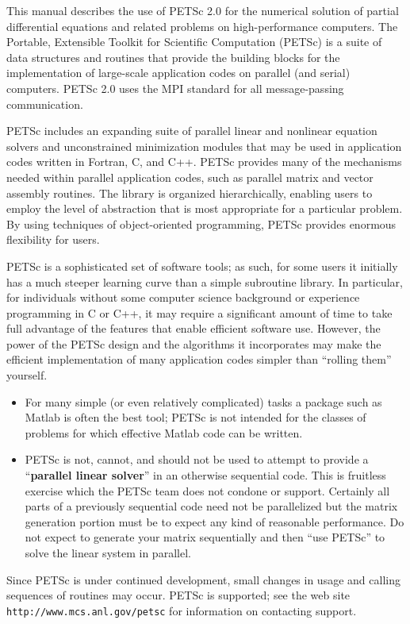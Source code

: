 
%
%

\medskip \medskip
This manual describes the use of PETSc 2.0 for the numerical solution
of partial differential equations and related problems 
on high-performance computers.  The
Portable, Extensible Toolkit for Scientific Computation (PETSc) is a
suite of data structures and routines that provide the building
blocks for the implementation of large-scale application codes on parallel
(and serial) computers.  PETSc 2.0 uses the MPI standard for all
message-passing communication.

PETSc includes an expanding suite of parallel linear and nonlinear
equation solvers and unconstrained minimization modules that may be
used in application codes written in Fortran, C, and C++.  PETSc
provides many of the mechanisms needed within parallel application
codes, such as parallel matrix and vector assembly routines. The library is
organized hierarchically, enabling users to employ the level of
abstraction that is most appropriate for a particular problem. By
using techniques of object-oriented programming, PETSc provides
enormous flexibility for users.

PETSc is a sophisticated set of software tools; as such, for some
users it initially has a much steeper learning curve than a simple
subroutine library. In particular, for individuals without some
computer science background or experience programming in C or C++, it
may require a significant amount of time to take full advantage of the
features that enable efficient software use.  However, the power of
the PETSc design and the algorithms it incorporates may make the efficient
implementation of many application codes simpler than ``rolling
them'' yourself.
\begin{itemize}
\item  For many simple (or even relatively complicated)
tasks a package such as Matlab is often the best tool; PETSc is not
intended for the classes of problems for which effective Matlab code
can be written.
\item PETSc is not, cannot, and should not be used to attempt to provide
a ``{\bf parallel linear solver}'' in an otherwise sequential code. This is 
fruitless exercise which the PETSc team does not condone or support. Certainly
all parts of a previously sequential code need not be parallelized but the 
matrix generation portion must be to expect any kind of reasonable performance.
Do not expect to generate your matrix sequentially and then ``use PETSc'' to solve
the linear system in parallel.
\end{itemize}

Since PETSc is under continued development, small changes in usage and
calling sequences of routines may occur.  PETSc is supported; see the
web site {\tt http://www.mcs.anl.gov/petsc} for information on
contacting support.

\medskip \medskip



